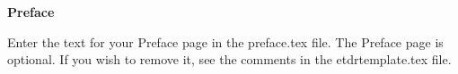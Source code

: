 
\newpage
\vspace*{0.9cm}
\begin{center}
{\bf \Huge Preface}
\end{center}

\setlength{\baselineskip}{0.8cm}



Enter the text for your Preface page in the preface.tex file. The Preface page is optional.  If you wish to remove it, see the comments in the etdrtemplate.tex file.
